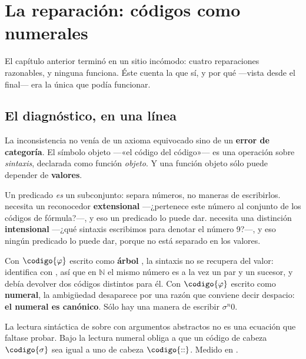 \chapter{La reparación: códigos como numerales}
\label{cap:numerales}

El capítulo anterior terminó en un sitio incómodo: cuatro reparaciones razonables, y ninguna
funciona. Éste cuenta la que sí, y por qué —vista desde el final— era la única que podía funcionar.

\section{El diagnóstico, en una línea}

La inconsistencia no venía de un axioma equivocado sino de un \textbf{error de categoría}. El
símbolo objeto  —«el código del código»— es una operación sobre \emph{sintaxis},
declarada como función \emph{objeto}. Y una función objeto sólo puede depender de \textbf{valores}.

\begin{leccion}
Un predicado \emph{es} un subconjunto: separa números, no maneras de escribirlos.
 necesita un reconocedor \textbf{extensional} —¿pertenece este número al conjunto de
los códigos de fórmula?—, y eso un predicado lo puede dar.  necesita una distinción
\textbf{intensional} —¿qué sintaxis escribimos para denotar el número 9?—, y eso ningún predicado
lo puede dar, porque no está separado en los valores.
\end{leccion}

Con $\codigo{\varphi}$ escrito como \textbf{árbol} , la sintaxis no se recupera del
valor:  identifica  con , así que en
$\mathbb{N}$ el mismo número es a la vez un par y un sucesor, y  debía devolver dos
códigos distintos para él. Con $\codigo{\varphi}$ escrito como \textbf{numeral}, la ambigüedad
desaparece por una razón que conviene decir despacio: \textbf{el numeral es canónico}. Sólo hay una
manera de escribir $\sigma^n 0$.

\begin{refutado}
La lectura sintáctica de  sobre  con argumentos abstractos no es una ecuación
que faltase probar. Bajo la lectura numeral obliga a que un código de cabeza $\codigo{\sigma}$ sea
igual a uno de cabeza $\codigo{::}$. Medido en .
\end{refutado}

